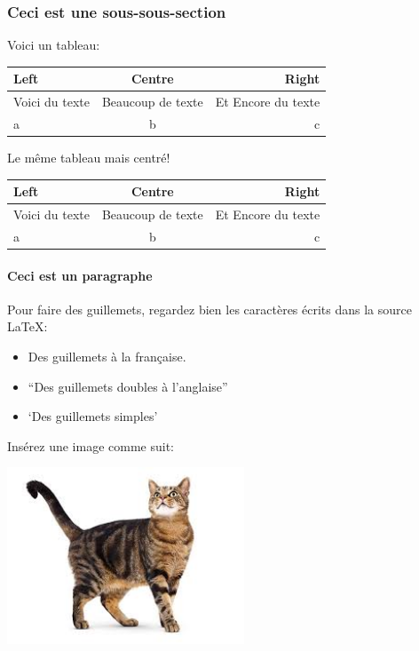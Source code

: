\documentclass[paper=a4, fontsize=11pt]{article}
\begin{document}
\subsubsection{Ceci est une sous-sous-section}

Voici un tableau:\\ %

\begin{tabular}{lcr} %
\toprule
Left & Centre & Right \\
\midrule
Voici du texte & Beaucoup de texte & Et Encore du texte \\
a & b & c \\
\bottomrule
\end{tabular}

\vspace{0.5cm} %

Le même tableau mais centré!

\begin{center}
\begin{tabular}{lcr} %
\toprule
Left & Centre & Right \\
\midrule
Voici du texte & Beaucoup de texte & Et Encore du texte \\
a & b & c \\
\bottomrule
\end{tabular}
\end{center}

\paragraph{Ceci est un paragraphe}
Pour faire des guillemets, regardez bien les caractères écrits dans la source \LaTeX: 
\begin{itemize}
\item \og Des guillemets à la française\fg{}.
\item ``Des guillemets doubles à l'anglaise''
\item `Des guillemets simples'
\end{itemize}

\vspace{0.5cm} %

Insérez une image comme suit:

\includegraphics[width=200pt]{myimage.jpg} %
\end{document}
